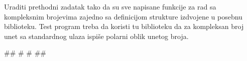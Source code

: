\begin{Exercise}[label=1_02] %
Uraditi prethodni zadatak tako da su sve napisane funkcije za rad sa kompleksnim brojevima zajedno sa definicijom strukture  izdvojene u posebnu biblioteku. Test program treba da koristi tu biblioteku da za kompleksan broj unet sa standardnog ulaza ispiše polarni oblik unetog broja.

\begin{maxitest}
\begin{upotreba}{1}
#\naslovInt#
# #
##
\end{upotreba}
\end{maxitest}


\end{Exercise}
\begin{Answer}[ref=1_02]
\end{Answer}


